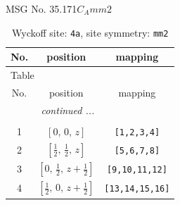 \documentclass[fleqn,8pt]{jsarticle}
\begin{document}
\setcounter{MaxMatrixCols}{32}

\renewcommand{\tablename}{Table~}
\renewcommand{\figurename}{Figure~}
\begin{center}
\LARGE
MSG No. 35.171\quad$C_{A}mm2$
\end{center}
\renewcommand{\arraystretch}{1.2}
\begin{longtable}{ccc}
\caption{Wyckoff site: {\tt 4a}, site symmetry: {\tt mm2}}
 \\
 \hline \hline
No. & position & mapping \\ \hline \endfirsthead

\multicolumn{2}{l}{\tablename\ \thetable{}} \\
 \hline \hline
No. & position & mapping \\ \hline \endhead

 \hline \hline
\multicolumn{2}{r}{\footnotesize\it continued ...} \\ \endfoot

 \hline \hline
\multicolumn{2}{r}{} \\ \endlastfoot

1 & $\left[ 0,\, 0,\, z \right]$ & {\tt [1,2,3,4]} \\ \hline
2 & $\left[ \frac{1}{2},\, \frac{1}{2},\, z \right]$ & {\tt [5,6,7,8]} \\ \hline
3 & $\left[ 0,\, \frac{1}{2},\, z + \frac{1}{2} \right]$ & {\tt [9,10,11,12]} \\ \hline
4 & $\left[ \frac{1}{2},\, 0,\, z + \frac{1}{2} \right]$ & {\tt [13,14,15,16]} \\
\end{longtable}
\renewcommand{\arraystretch}{1.2}
\end{document}
